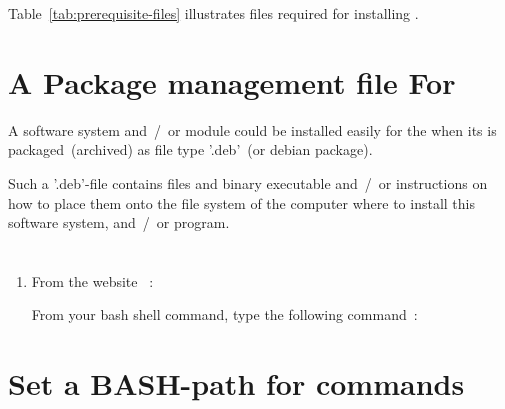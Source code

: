 \vspace*{1em}

Table~\ref{tab:prerequisite-files} illustrates files required
for installing \yeritherp.


\vspace*{0.95em}



\section{A Package management file For \debianlinux}

A software system and~/~or module could be installed easily
for the  
when its is packaged~(archived) as file type 
'.deb'~(or debian package).

\qquad
Such a '.deb'-file contains files and binary executable
and~/~or instructions on how to place them onto the file
system of the computer where to install this software system,
and~/~or program.



\newpage



\section{}

\begin{enumerate}[$1.)$]
	\itemsep 0.42em
	
	\item From the website ~:
	
	\qquad
	From your bash shell command, type the following command~:
		\vspace*{-0.15em}	
		\begin{alltt}
		\end{alltt}			
\end{enumerate}



\section{Set a BASH-path for \yeritherp commands}

